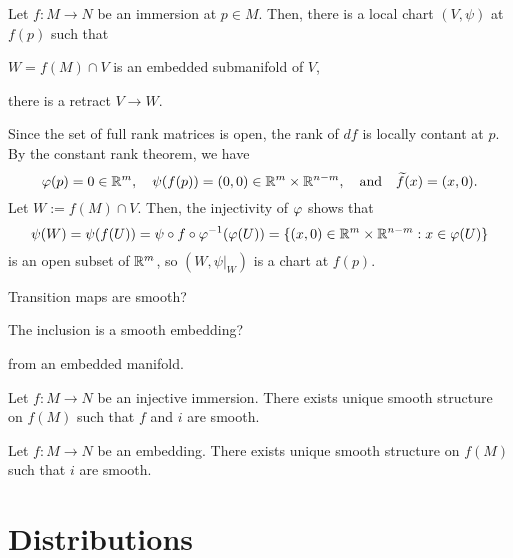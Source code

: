 \documentclass{../note}
\begin{document}
\begin{prb}
Let $f:M\to N$ be an immersion at $p\in M$.
Then, there is a local chart $(V,\psi)$ at $f(p)$ such that
\begin{parts}
\item $W=f(M)\cap V$ is an embedded submanifold of $V$,
\item there is a retract $V\to W$.
\end{parts}
\end{prb}
\begin{pf}
Since the set of full rank matrices is open, the rank of $df$ is locally contant at $p$.
By the constant rank theorem, we have
\[\varphi(p)=0\in\mathbb{R}^m,\quad\psi(f(p))=(0,0)\in\mathbb{R}^m\times\mathbb{R}^{n-m},\quad\text{and}\quad\widetilde f(x)=(x,0).\]
Let $W:=f(M)\cap V$.
Then, the injectivity of $\varphi$ shows that
\[\psi(W)=\psi(f(U))=\psi\circ f\circ\varphi^{-1}(\varphi(U))=\{(x,0)\in\mathbb{R}^m\times\mathbb{R}^{n-m}:x\in\varphi(U)\}\]
is an open subset of $\mathbb{R}^m$, so $(W,\psi|_W)$ is a chart at $f(p)$.

Transition maps are smooth?

The inclusion is a smooth embedding?
\end{pf}

\begin{prb}
from an embedded manifold.
\end{prb}


Let $f:M\to N$ be an injective immersion.
There exists unique smooth structure on $f(M)$ such that $f$ and $i$ are smooth.

Let $f:M\to N$ be an embedding.
There exists unique smooth structure on $f(M)$ such that $i$ are smooth.



\section{Distributions}
\begin{prb}[Foliation]
\end{prb}
\end{document}
